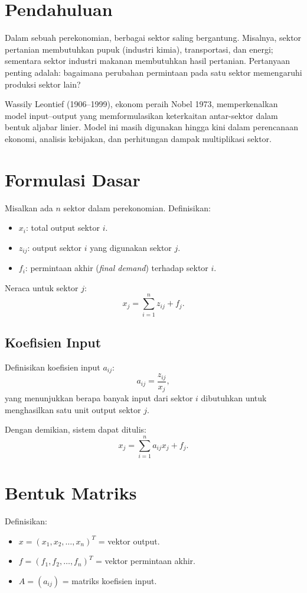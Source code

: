 \documentclass{bukumjh}
\begin{document}
\section{Pendahuluan}
Dalam sebuah perekonomian, berbagai sektor saling bergantung. Misalnya, sektor pertanian membutuhkan pupuk (industri kimia), transportasi, dan energi; sementara sektor industri makanan membutuhkan hasil pertanian. Pertanyaan penting adalah: bagaimana perubahan permintaan pada satu sektor memengaruhi produksi sektor lain?

Wassily Leontief (1906–1999), ekonom peraih Nobel 1973, memperkenalkan {\jsg model input–output} yang memformulasikan keterkaitan antar-sektor dalam bentuk aljabar linier. Model ini masih digunakan hingga kini dalam perencanaan ekonomi, analisis kebijakan, dan perhitungan dampak multiplikasi sektor.

\section{Formulasi Dasar}
Misalkan ada $n$ sektor dalam perekonomian. Definisikan:
\begin{itemize}
    \item $x_i$: total output sektor $i$.
    \item $z_{ij}$: output sektor $i$ yang digunakan sektor $j$.
    \item $f_i$: permintaan akhir (\textit{final demand}) terhadap sektor $i$.
\end{itemize}

Neraca untuk sektor $j$:
\[
x_j = \sum_{i=1}^n z_{ij} + f_j.
\]

\subsection{Koefisien Input}
Definisikan koefisien input $a_{ij}$:
\[
a_{ij} = \frac{z_{ij}}{x_j},
\]
yang menunjukkan berapa banyak input dari sektor $i$ dibutuhkan untuk menghasilkan satu unit output sektor $j$.

Dengan demikian, sistem dapat ditulis:
\[
x_j = \sum_{i=1}^n a_{ij} x_j + f_j.
\]

\section{Bentuk Matriks}
Definisikan:
\begin{itemize}
    \item $x = (x_1, x_2, \dots, x_n)^T$ = vektor output.
    \item $f = (f_1, f_2, \dots, f_n)^T$ = vektor permintaan akhir.
    \item $A = (a_{ij})$ = matriks koefisien input.
\end{itemize}
\end{document}
